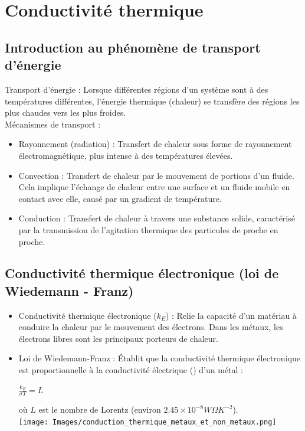 \documentclass{article}
\begin{document}
\section{Conductivité thermique}
    \subsection{Introduction au phénomène de transport d'énergie}
    Transport d'énergie : Lorsque différentes régions d'un système sont à des températures différentes, l'énergie thermique (chaleur) se transfère des régions les plus chaudes vers les plus froides. \\
    Mécanismes de transport : 
    \begin{itemize}
        \item Rayonnement (radiation) : Transfert de chaleur sous forme de rayonnement électromagnétique, plus intense à des températures élevées.
        \item Convection : Transfert de chaleur par le mouvement de portions d'un fluide. Cela implique l'échange de chaleur entre une surface et un fluide mobile en contact avec elle, causé par un gradient de température.
        \item Conduction : Transfert de chaleur à travers une substance solide, caractérisé par la transmission de l'agitation thermique des particules de proche en proche.
    \end{itemize}

    \subsection{Conductivité thermique électronique (loi de Wiedemann - Franz)}
    \begin{itemize}
        \item Conductivité thermique électronique ($k_E$) : Relie la capacité d'un matériau à conduire la chaleur par le mouvement des électrons. Dans les métaux, les électrons libres sont les principaux porteurs de chaleur.
        \item Loi de Wiedemann-Franz : Établit que la conductivité thermique électronique est proportionnelle à la conductivité électrique () d'un métal :
        \begin{center}
            $\frac{k_E}{\sigma T} = L$
        \end{center}
        où $L$ est le nombre de Lorentz (environ $2.45 \times 10^{-8} W \Omega K^{-2}$). \\
            \texttt{[image: Images/conduction\_thermique\_metaux\_et\_non\_metaux.png]}
    \end{itemize}
\end{document}
